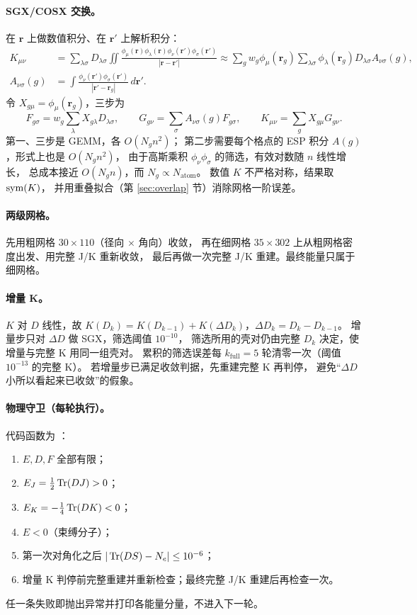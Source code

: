 \paragraph{SGX/COSX 交换。}
在 \(\bm r\) 上做数值积分、在 \(\bm r'\) 上解析积分：
\begin{align}
K_{\mu\nu}&=\sum_{\lambda\sigma}D_{\lambda\sigma}
\iint\frac{\phi_\mu(\bm r)\phi_\lambda(\bm r)\phi_\nu(\bm r')\phi_\sigma(\bm r')}{|\bm r-\bm r'|}
\approx\sum_gw_g\phi_\mu(\bm r_g)\sum_{\lambda\sigma}\phi_\lambda(\bm r_g)D_{\lambda\sigma}A_{\nu\sigma}(g),\\
A_{\nu\sigma}(g)&=\int\frac{\phi_\nu(\bm r')\phi_\sigma(\bm r')}{|\bm r'-\bm r_g|}\,d\bm r' .
\end{align}
令 \(X_{g\mu}=\phi_\mu(\bm r_g)\)，三步为
\begin{equation}
F_{g\sigma}=w_g\sum_\lambda X_{g\lambda}D_{\lambda\sigma},\qquad
G_{g\nu}=\sum_\sigma A_{\nu\sigma}(g)F_{g\sigma},\qquad
K_{\mu\nu}=\sum_gX_{g\mu}G_{g\nu}.
\label{eq:rep-sgx}
\end{equation}
第一、三步是 GEMM，各 \(O(N_gn^2)\)；
第二步需要每个格点的 ESP 积分 \(A(g)\)，形式上也是 \(O(N_gn^2)\)，
由于高斯乘积 \(\phi_\nu\phi_\sigma\) 的筛选，有效对数随 \(n\) 线性增长，
总成本接近 \(O(N_gn)\)，而 \(N_g\propto N_{\mathrm{atom}}\)。
数值 \(K\) 不严格对称，结果取 \(\operatorname{sym}(K)\)，
并用重叠拟合（第 \ref{sec:overlap} 节）消除网格一阶误差。
\paragraph{两级网格。}
先用粗网格 \(30\times110\)（径向 \(\times\) 角向）收敛，
再在细网格 \(35\times302\) 上从粗网格密度出发、用完整 J/K 重新收敛，
最后再做一次完整 J/K 重建。最终能量只属于细网格。

\paragraph{增量 K。}
\(K\) 对 \(D\) 线性，故
\(K(D_{k})=K(D_{k-1})+K(\Delta D_k)\)，\(\Delta D_k=D_k-D_{k-1}\)。
增量步只对 \(\Delta D\) 做 SGX，筛选阈值 \(10^{-10}\)，
筛选所用的壳对仍由完整 \(D_k\) 决定，使增量与完整 K 用同一组壳对。
累积的筛选误差每 \(k_{\mathrm{full}}=5\) 轮清零一次（阈值 \(10^{-13}\) 的完整 K）。
若增量步已满足收敛判据，先重建完整 K 再判停，
避免“\(\Delta D\) 小所以看起来已收敛”的假象。

\paragraph{物理守卫（每轮执行）。}
代码函数为 ：
\begin{enumerate}
\item \(E,D,F\) 全部有限；
\item \(E_J=\frac12\operatorname{Tr}(DJ)>0\)；
\item \(E_K=-\frac14\operatorname{Tr}(DK)<0\)；
\item \(E<0\)（束缚分子）；
\item 第一次对角化之后 \(|\operatorname{Tr}(DS)-N_e|\leq10^{-6}\)；
\item 增量 K 判停前完整重建并重新检查；最终完整 J/K 重建后再检查一次。
\end{enumerate}
任一条失败即抛出异常并打印各能量分量，不进入下一轮。

